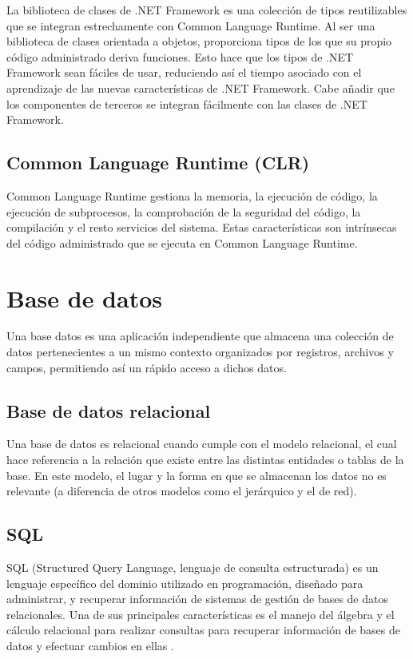 La biblioteca de clases de .NET Framework es una colección de tipos reutilizables que se integran estrechamente con Common Language Runtime. Al ser una biblioteca de clases orientada a objetos, proporciona tipos de los que su propio código administrado deriva funciones. Esto hace que los tipos de .NET Framework sean fáciles de usar, reduciendo así el tiempo asociado con el aprendizaje de las nuevas características de .NET Framework. Cabe añadir que los componentes de terceros se integran fácilmente con las clases de .NET Framework.

\subsection{Common Language Runtime (CLR)}

Common Language Runtime gestiona la memoria, la ejecución de código, la ejecución de subprocesos, la comprobación de la seguridad del código, la compilación y el resto servicios del sistema. Estas características son intrínsecas del código administrado que se ejecuta en Common Language Runtime.

\section{Base de datos}

Una base datos es una aplicación independiente que almacena una colección de datos pertenecientes a un mismo contexto organizados por registros, archivos y campos, permitiendo así un rápido acceso a dichos datos.

\subsection{Base de datos relacional}

Una base de datos es relacional cuando cumple con el modelo relacional, el cual hace referencia a la relación que existe entre las distintas entidades o tablas de la base. En este modelo, el lugar y la forma en que se almacenan los datos no es relevante (a diferencia de otros modelos como el jerárquico y el de red).

\subsection{SQL}

SQL (Structured Query Language, lenguaje de consulta estructurada) es un lenguaje específico del dominio utilizado en programación, diseñado para administrar, y recuperar información de sistemas de gestión de bases de datos relacionales. Una de sus principales características es el manejo del álgebra y el cálculo relacional para realizar consultas para recuperar información de bases de datos y efectuar cambios en ellas \cite{wiki:sql}.


